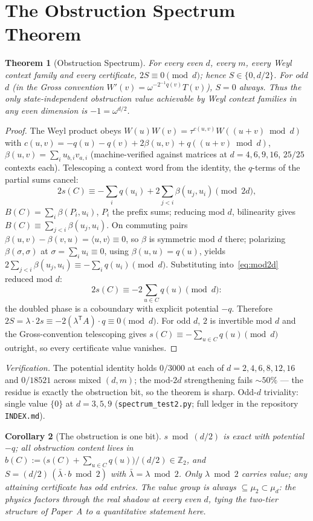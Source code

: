 \documentclass[11pt]{article}
\newtheorem{theorem}{Theorem}
\newtheorem{corollary}[theorem]{Corollary}
\theoremstyle{remark}
\newcommand{\Z}{\mathbb{Z}}
\newcommand{\ip}[2]{\langle #1,#2\rangle}
\begin{document}
\section{The Obstruction Spectrum Theorem}
\begin{theorem}[Obstruction Spectrum]\label{thm:spectrum}
For every even $d$, every $m$, every Weyl context family and every certificate, $2S\equiv 0\pmod d$;
hence $S\in\{0,d/2\}$. For odd $d$ (in the Gross convention $W'(v)=\omega^{-2^{-1}q(v)}T(v)$), $S=0$
always. Thus the only state-independent obstruction value achievable by Weyl context families in any
even dimension is $-1=\omega^{d/2}$.
\end{theorem}
\begin{proof}
The Weyl product obeys $W(u)W(v)=\tau^{c(u,v)}W((u+v)\bmod d)$ with
$c(u,v)=-q(u)-q(v)+2\beta(u,v)+q((u+v)\bmod d)$, $\beta(u,v)=\sum_i u_{b,i}v_{a,i}$ (machine-verified
against matrices at $d=4,6,9,16$, $25/25$ contexts each). Telescoping a context word from the
identity, the $q$-terms of the partial sums cancel:
\begin{equation}\label{eq:mod2d}
2s(C)\equiv -\sum_i q(u_i)+2\sum_{j<i}\beta(u_j,u_i)\pmod{2d},
\end{equation}
$B(C)=\sum_i \beta(P_i,u_i)$, $P_i$ the prefix sums; reducing mod $d$, bilinearity gives
$B(C)\equiv\sum_{j<i}\beta(u_j,u_i)$. On commuting pairs $\beta(u,v)-\beta(v,u)=\ip{u}{v}\equiv 0$, so
$\beta$ is symmetric mod $d$ there; polarizing $\beta(\sigma,\sigma)$ at $\sigma=\sum_i u_i\equiv 0$,
using $\beta(u,u)=q(u)$, yields $2\sum_{j<i}\beta(u_j,u_i)\equiv -\sum_i q(u_i)\pmod d$. Substituting
into~\eqref{eq:mod2d} reduced mod $d$:
\[
2s(C)\equiv -2\sum_{u\in C}q(u)\pmod d :
\]
the doubled phase is a coboundary with explicit potential $-q$. Therefore
$2S=\lambda\cdot 2s\equiv -2(\lambda^{\mathsf T}A)\cdot q\equiv 0\pmod d$. For odd $d$, $2$ is
invertible mod $d$ and the Gross-convention telescoping gives $s(C)\equiv-\sum_{u\in C}q(u)\pmod d$
outright, so every certificate value vanishes.
\end{proof}

\noindent\emph{Verification.} The potential identity holds $0/3000$ at each of $d=2,4,6,8,12,16$ and
$0/18521$ across mixed $(d,m)$; the mod-$2d$ strengthening fails ${\sim}50\%$ --- the residue is
exactly the obstruction bit, so the theorem is sharp. Odd-$d$ triviality: single value $\{0\}$ at
$d=3,5,9$ (\texttt{spectrum\_test2.py}; full ledger in the repository \texttt{INDEX.md}).

\begin{corollary}[The obstruction is one bit]\label{cor:bit}
$s\bmod (d/2)$ is exact with potential $-q$; all obstruction content lives in
$b(C):=\big(s(C)+\sum_{u\in C}q(u)\big)/(d/2)\in\Z_2$, and $S=(d/2)\,(\bar\lambda\cdot b\bmod 2)$ with
$\bar\lambda=\lambda\bmod 2$. Only $\lambda\bmod 2$ carries value; any attaining certificate has odd
entries. The value group is always $\subseteq\mu_2\subset\mu_d$: the physics factors through the real
shadow at every even $d$, tying the two-tier structure of Paper~A to a quantitative statement here.
\end{corollary}
\end{document}
